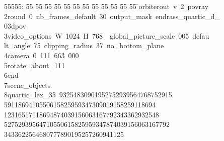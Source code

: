 %
%
\begin{tabbing}
55555: \= 55 \= 55 \= 55 \= 55 \= 55 \= 55 \= 55 \= 55 \= 55 \= 55 \= 55 \= 55 \= \>orbiterout\ v\ 2\ povray\ \\[0pt]
2\>\>round\ 0\ nb\_frames\_default\ 30\ output\_mask\ endrass\_quartic\_d\_\\[0pt]
\>03dpov\ \\[0pt]
3\>\>video\_options\ W\ 1024\ H\ 768\ \ global\_picture\_scale\ 005\ defau\\[0pt]
\>lt\_angle\ 75\ clipping\_radius\ 37\ no\_bottom\_plane\ \\[0pt]
4\>\>camera\ 0\ 111\ 663\ 000\ \ \\[0pt]
5\>\>rotate\_about\_111\ \\[0pt]
6\>\>end\ \\[0pt]
7\>\>scene\_objects\ \\[0pt]
8\>\>\>quartic\_lex\_35\ 93254830901952752939564768752915\\[0pt]
5911869410550615825959347309019158259118694\\[0pt]
12316517118694874039156063167792343362932548\\[0pt]
\>52752939564710550615825959347874039156063167792\\[0pt]
\>3433622564680777890195257260941125\ \\[0pt]

\end{tabbing}
